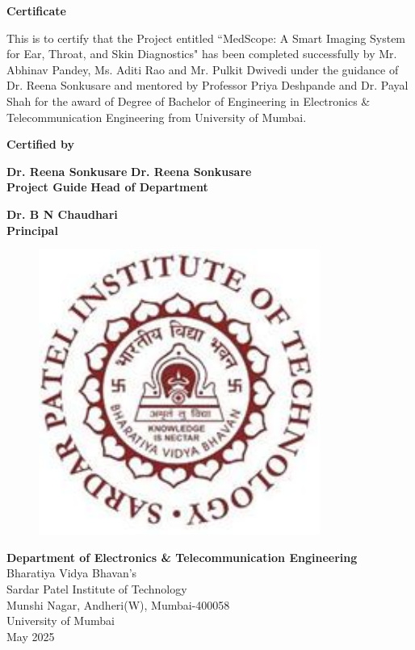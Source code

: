 \thispagestyle{empty}
\vspace*{0.2cm}
\vspace{1cm}
\begin{center}
\large\textbf{Certificate}
\end{center}
\vspace{1cm}
This is to certify that the Project entitled ``MedScope: A Smart Imaging System for Ear, Throat, and Skin Diagnostics" has been completed successfully by Mr. Abhinav Pandey, Ms. Aditi Rao and Mr. Pulkit Dwivedi under the guidance of Dr. Reena Sonkusare and mentored by Professor Priya Deshpande and Dr. Payal Shah for the award of Degree of Bachelor of Engineering in Electronics \& Telecommunication Engineering from University of Mumbai.\\
\vspace{1cm}
\begin{center}
\textbf{Certified by}
\end{center}
\vspace{1cm}


\textbf {Dr. Reena Sonkusare} \hspace{2.4in} \textbf{Dr. Reena Sonkusare   }\\ \hspace*{0.5cm}
\textbf {Project Guide} \hspace{3in} \textbf{Head of Department} \\
\vspace{1cm}
 

\begin{center}
\textbf{Dr. B N Chaudhari}\\
\textbf{Principal}
\end{center}
 
\begin{figure}[h]
\centering
\includegraphics[scale=0.8]{spitlogo.pdf}

\end{figure}
\hspace{.05cm}
\hspace{.05cm}
 
\begin{center}
\textbf {Department of Electronics \& Telecommunication Engineering}\\
Bharatiya  Vidya Bhavan's\\
Sardar Patel Institute of Technology\\
Munshi Nagar, Andheri(W), Mumbai-400058\\
University of Mumbai\\
May 2025\\
\end{center}

